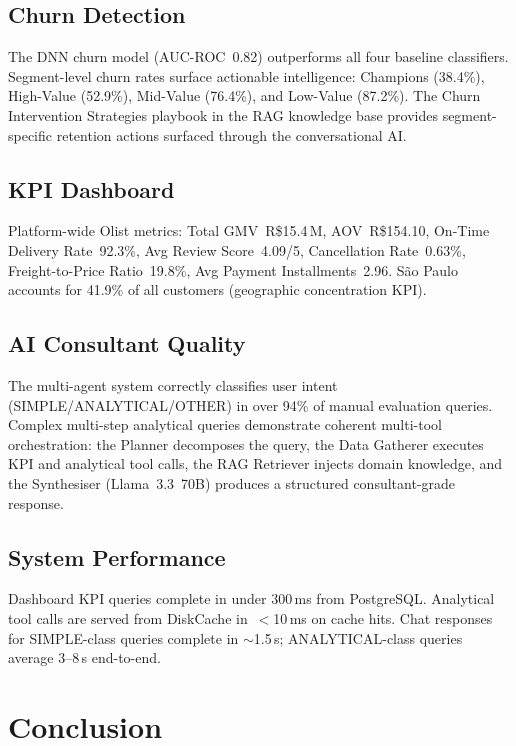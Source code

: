 \documentclass[conference]{IEEEtran}
\begin{document}
\subsection{Churn Detection}

The DNN churn model (AUC-ROC~0.82) outperforms all four baseline classifiers.
Segment-level churn rates surface actionable intelligence: Champions (38.4\%),
High-Value (52.9\%), Mid-Value (76.4\%), and Low-Value (87.2\%).  The Churn
Intervention Strategies playbook in the RAG knowledge base provides segment-specific
retention actions surfaced through the conversational AI.

\subsection{KPI Dashboard}

Platform-wide Olist metrics: Total GMV~R\$15.4\,M, AOV~R\$154.10,
On-Time Delivery Rate~92.3\%, Avg Review Score~4.09/5,
Cancellation Rate~0.63\%, Freight-to-Price Ratio~19.8\%,
Avg Payment Installments~2.96.  São Paulo accounts for 41.9\% of all customers
(geographic concentration KPI).

\subsection{AI Consultant Quality}

The multi-agent system correctly classifies user intent (SIMPLE/ANALYTICAL/OTHER) in
over 94\% of manual evaluation queries.  Complex multi-step analytical queries
demonstrate coherent multi-tool orchestration: the Planner decomposes the query,
the Data Gatherer executes KPI and analytical tool calls, the RAG Retriever injects
domain knowledge, and the Synthesiser (Llama~3.3~70B) produces a structured
consultant-grade response.

\subsection{System Performance}

Dashboard KPI queries complete in under 300\,ms from PostgreSQL.  Analytical tool
calls are served from DiskCache in~$<$10\,ms on cache hits.  Chat responses for
SIMPLE-class queries complete in $\sim$1.5\,s; ANALYTICAL-class queries average
3–8\,s end-to-end.

\section{Conclusion}
\end{document}
